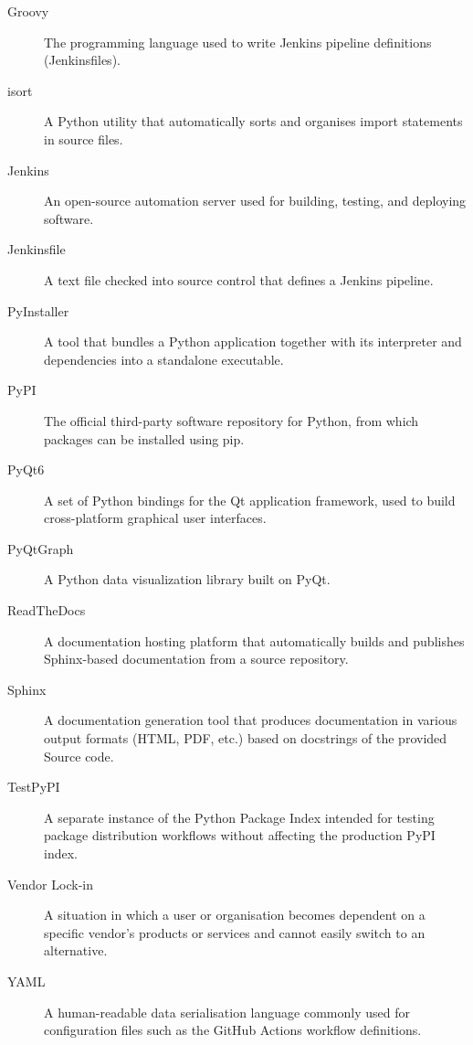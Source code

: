 \documentclass{llncs}
\begin{document}
\begin{description}
\item[Groovy] The programming language used to write Jenkins pipeline definitions (Jenkinsfiles).

\item[isort] A Python utility that automatically sorts and organises import statements in source files.

\item[Jenkins] An open-source automation server used for building, testing, and deploying software.

\item[Jenkinsfile] A text file checked into source control that defines a Jenkins pipeline.

\item[PyInstaller] A tool that bundles a Python application together with its interpreter and dependencies into a standalone executable.

\item[PyPI] The official third-party software repository for Python, from which packages can be installed using pip.

\item[PyQt6] A set of Python bindings for the Qt application framework, used to build cross-platform graphical user interfaces.

\item[PyQtGraph] A Python data visualization library built on PyQt.

\item[ReadTheDocs] A documentation hosting platform that automatically builds and publishes Sphinx-based documentation from a source repository.

\item[Sphinx] A documentation generation tool that produces documentation in various output formats (HTML, PDF, etc.) based on docstrings of the provided Source code.

\item[TestPyPI] A separate instance of the Python Package Index intended for testing package distribution workflows without affecting the production PyPI index.

\item[Vendor Lock-in] A situation in which a user or organisation becomes dependent on a specific vendor's products or services and cannot easily switch to an alternative.

\item[YAML] A human-readable data serialisation language commonly used for configuration files such as the GitHub Actions workflow definitions.

\end{description}
\end{document}
